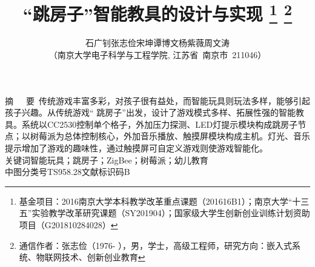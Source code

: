 

\songti
\title{\huge{“跳房子”智能教具的设计与实现}
\thanks{基金项目：2016南京大学本科教学改革重点课题（201616B1）；南京大学“十三五”实验教学改革研究课题（SY201904）；国家级大学生创新创业训练计划资助项目（G201810284028）}
\thanks{通信作者：张志俭（1976- ），男，学士，高级工程师，研究方向：嵌入式系统、物联网技术、创新创业教育}
}
\author{石广钊\quad 张志俭\quad 宋坤\quad  谭博文\quad 杨紫薇\quad 周文涛\\[2pt]
\normalsize
（南京大学电子科学与工程学院, 江苏省~南京市~211046） \\[2pt]}
\date{}  %


\maketitle

\setlength{\oddsidemargin}{1cm}  %
\setlength{\evensidemargin}{\oddsidemargin}
\setlength{\textwidth}{13.50cm}
\vspace{-.8cm}
\begin{center}
\parbox{\textwidth}{
\heiti 摘~~~要\quad \kaishu~传统游戏丰富多彩，对孩子很有益处，而智能玩具则玩法多样，能够引起孩子兴趣。从传统游戏“ 跳房子”出发，设计了游戏模式多样、拓展性强的智能教具。系统以CC2530控制单个格子，外加压力探测、LED灯提示模块构成跳房子节点；以树莓派为总体控制核心，外加音乐播放、触摸屏模块构成主机。灯光、音乐提示增加了游戏的趣味性，通过触摸屏可自定义游戏则使游戏智能化。\\
\heiti 关键词\quad\kaishu 智能玩具；跳房子；ZigBee；树莓派；幼儿教育\\
\heiti 中图分类号\quad TS958.28\qquad  \heiti 文献标识码\quad B}
\end{center}

